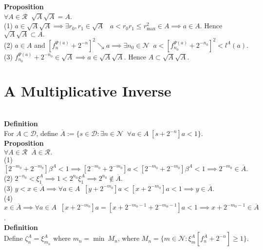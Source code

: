 \documentclass{article}
\newcommand{\targetset}{ \mathscr{R}}
\newcommand{\sourceset}{ \mathscr{D}}
\newcommand{\naturals}{ \mathscr{N}}
\newcommand{\carpenter}{ \xi }
\newcommand{\leaper}{l}
\newcommand{\elt}{a}
\newcommand{\altelt}{s}
\newcommand{\rooter}{\Psi}
\newcommand{\invmark}{\overline}
\newcommand{\umbrella}{\beta}
\newcommand{\prevert}{\zeta}
\begin{document}
\textbf{Proposition}\\
$\forall A \in \targetset \;\; \sqrt{A} \sqrt{A} = A$.\\ 

(1) $\elt \in \sqrt{A} \sqrt{A}\implies \exists r_0, r_1 \in \sqrt{A} \;\;\; \elt < r_0r_1 \le r_{\max}^2 \in A \implies \elt \in A$. Hence $\sqrt{A} \sqrt{A} \subset A.$\\
(2) $a \in A$ and  $[f^{\rooter(a)}_n + 2^{-n}]^2 \searrow a \implies \exists n_0 \in \naturals \;\; a < [f^{\rooter(a)}_{n_0} + 2^{-n_0}]^2 < \leaper^A(a) $.\\
(3) $ f^{\rooter(a)}_{n_0} + 2^{-n_0} \in \sqrt{A} \implies a \in \sqrt{A}\sqrt{A}$. Hence $A \subset \sqrt{A} \sqrt{A}$.\\ 

\section{A Multiplicative Inverse}\\

\textbf{Definition}\\
For $A \subset \sourceset$, define $\invmark A := \{ \altelt \in \sourceset : \exists n \in \naturals \;\; \forall a \in A \; [\altelt + 2^{-n}]a < 1\}$.\\

\textbf{Proposition}\\
$\forall A \in \targetset \;\; \invmark A \in \targetset.$\\

(1) $[2^{-m_0} + 2^{-m_0} ]\umbrella^A < 1 \implies [2^{-m_0} + 2^{-m_0} ]a < [2^{-m_0} + 2^{-m_0} ]\umbrella^A < 1 \implies 2^{-m_0} \in \invmark A.$\\
(2) $2^{-n_0} < \carpenter^A_1 \implies 1 < 2^{n_0} \carpenter^A_1 \implies 2^{n_0} \notin \invmark A$.\\
(3) $y < x \in \invmark A \implies  \forall \elt \in A \;\; [ y + 2^{-m_0} ]a <  [ x + 2^{-m_0} ]a< 1 \implies y \in \invmark A$.\\
(4) $x \in \invmark A \implies \forall \elt \in A \;\; [x + 2^{-m_0}]a = [x + 2^{-m_0-1} + 2^{-m_0-1}]a < 1 \implies x + 2^{-m_0-1} \in \invmark A$.\\


\textbf{Definition}\\
Define $\prevert^{A}_n = \carpenter^A_{m_n}$ where $m_n = \min\ M_n$, where $M_n = \{ m \in \naturals : \carpenter^A_m [ f^{\invmark A}_n + 2^{-n}] \ge 1 \}$.\\
\end{document}
